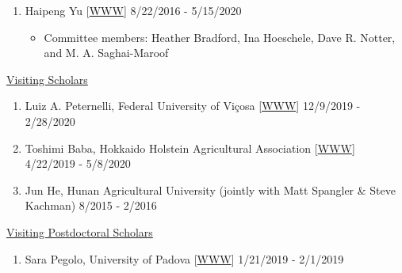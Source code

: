 \documentclass[margin,line,10pt]{res}
\begin{document}
\begin{resume}
\begin{enumerate}
    \vspace{0.3cm}

  \item [1.] Haipeng Yu [\textcolor{blue}{\href{https://haipengu.github.io/}{WWW}}]  \hfill 8/22/2016 - 5/15/2020
    \begin{itemize}
     \item  Committee members: Heather Bradford, Ina Hoeschele, Dave R. Notter, and M. A. Saghai-Maroof
    \end{itemize}
\end{enumerate}








\begin{flushleft}
\hspace{0.2cm} \underline{Visiting Scholars}
\end{flushleft}
\begin{enumerate}

\item [3.] Luiz A. Peternelli, Federal University of Vi\c cosa [\textcolor{blue}{\href{http://www.dpi.ufv.br/~peternelli/}{WWW}}]  \hfill 12/9/2019 - 2/28/2020

  \vspace{0.3cm}

      
\item [2.] Toshimi Baba, Hokkaido Holstein Agricultural Association [\textcolor{blue}{\href{https://researchmap.jp/t-baba/?lang=english}{WWW}}]  \hfill  4/22/2019 - 5/8/2020
  
  \vspace{0.3cm}

\item [1.] Jun He, Hunan Agricultural University (jointly with Matt Spangler \& Steve Kachman)  \hfill  8/2015 - 2/2016 
\end{enumerate}



\begin{flushleft}
\hspace{0.2cm} \underline{Visiting Postdoctoral Scholars}
\end{flushleft}
\begin{enumerate}
\item [2.] Sara Pegolo,  University of Padova [\textcolor{blue}{\href{https://www.researchgate.net/profile/Sara_Pegolo}{WWW}}]  \hfill 1/21/2019 - 2/1/2019
  
  \vspace{0.3cm}


\end{enumerate}
\end{resume}
\end{document}
